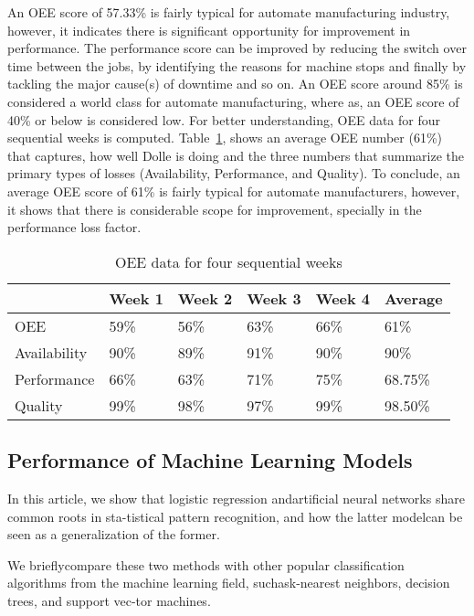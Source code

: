 \documentclass[runningheads]{llncs}
\begin{document}
An OEE score of 57.33\% is fairly typical for automate manufacturing industry, however, it indicates there is significant opportunity for improvement in performance. The performance score can be improved by reducing the switch over time between the jobs, by identifying the reasons for machine stops and finally by tackling the major cause(s) of downtime and so on. An OEE score around 85\% is considered a world class for automate manufacturing, where as, an OEE score of 40\% or below is considered low. For better understanding, OEE data for four sequential weeks is computed. Table~\ref{tab:dist}, shows an average OEE number (61\%) that captures, how well Dolle is doing and the three numbers that summarize the primary types of losses (Availability, Performance, and Quality). To conclude, an average OEE score of 61\% is fairly typical for automate manufacturers, however, it shows that there is considerable scope for improvement, specially in the performance loss factor.



\begin{table}[]
\label{tab:distance}
\centering
\caption{OEE data for four sequential weeks}
\begin{tabular}{p{2.4cm}p{1.6cm}p{1.6cm}p{1.6cm}p{1.6cm}p{1.6cm}}
\hline
\multicolumn{1}{l}{\textbf{}} &  \textbf{Week 1} & \textbf{Week 2} & \textbf{Week 3}& \textbf{Week 4} & \textbf{Average} \\ \hline
OEE             & 59\%& 56\% &  63\% & 66\% & 61\%\\
Availability             & 90\%& 89\% &  91\% & 90\% & 90\%\\
Performance            & 66\%& 63\% &  71\% & 75\% & 68.75\% \\
Quality             & 99\%& 98\% &  97\% & 99\% & 98.50\%\\
\hline
\end{tabular}
\label{tab:dist}
\end{table}


\subsection{Performance of Machine Learning Models}

In this article, we show that logistic regression andartificial neural networks share common roots in sta-tistical pattern recognition, and how the latter modelcan be seen as a generalization of the former. 

We brieflycompare these two methods with other popular classification algorithms from the machine learning field, suchask-nearest neighbors, decision trees, and support vec-tor machines.
\end{document}
